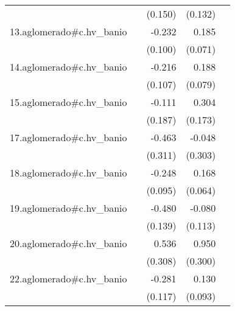 {\begin{longtable}{l*{4}{D{.}{.}{-1}}}
            &                     &     (0.150)         &     (0.132)         &                     \\
\addlinespace
13.aglomerado#c.hv\_banio&                     &      -0.232\sym{*}  &       0.185\sym{**} &                     \\
            &                     &     (0.100)         &     (0.071)         &                     \\
\addlinespace
14.aglomerado#c.hv\_banio&                     &      -0.216\sym{*}  &       0.188\sym{*}  &                     \\
            &                     &     (0.107)         &     (0.079)         &                     \\
\addlinespace
15.aglomerado#c.hv\_banio&                     &      -0.111         &       0.304         &                     \\
            &                     &     (0.187)         &     (0.173)         &                     \\
\addlinespace
17.aglomerado#c.hv\_banio&                     &      -0.463         &      -0.048         &                     \\
            &                     &     (0.311)         &     (0.303)         &                     \\
\addlinespace
18.aglomerado#c.hv\_banio&                     &      -0.248\sym{**} &       0.168\sym{**} &                     \\
            &                     &     (0.095)         &     (0.064)         &                     \\
\addlinespace
19.aglomerado#c.hv\_banio&                     &      -0.480\sym{***}&      -0.080         &                     \\
            &                     &     (0.139)         &     (0.113)         &                     \\
\addlinespace
20.aglomerado#c.hv\_banio&                     &       0.536         &       0.950\sym{**} &                     \\
            &                     &     (0.308)         &     (0.300)         &                     \\
\addlinespace
22.aglomerado#c.hv\_banio&                     &      -0.281\sym{*}  &       0.130         &                     \\
            &                     &     (0.117)         &     (0.093)         &                     \\

\end{longtable}}
